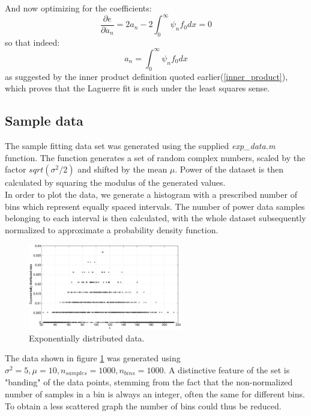 \documentclass[a4paper]{article}
\numberwithin{equation}{section}
\begin{document}
\noindent And now optimizing for the coefficients:
\begin{equation}
\frac{\partial e}{\partial a_n} = 2a_n - 2 \int_{0}^{\infty} \psi_nf_0dx = 0
\end{equation}
so that indeed:
\begin{equation}
a_n = \int_{0}^{\infty} \psi_nf_0dx
\end{equation}
as suggested by the inner product definition quoted earlier(\ref{inner_product}), which proves that the Laguerre fit is such under the least squares sense.

\subsection{Sample data}
The sample fitting data set was generated using the supplied \textit{exp\_data.m} function.
The function generates a set of random complex numbers, scaled by the factor $sqrt(\sigma^2/2)$ and shifted by the mean $\mu$. Power of the dataset is then calculated by squaring the modulus of the generated values. \\
In order to plot the data, we generate a histogram with a prescribed number of bins which represent equally spaced intervals. The number of power data samples belonging to each interval is then calculated, with the whole dataset subsequently normalized to approximate a probability density function.

\begin{figure}
\centering
\includegraphics[width=0.6\textwidth]{exp_data.eps}
\caption{\label{fig:expdata}Exponentially distributed data.}
\end{figure}

\noindent The data shown in figure \ref{fig:expdata} was generated using $\sigma^2=5, \mu=10, n_{samples} = 1000, n_{bins} = 1000$. A distinctive feature of the set is "banding" of the data points, stemming from the fact that the non-normalized number of samples in a bin is always an integer, often the same for different bins. To obtain a less scattered graph the number of bins could thus be reduced.
\end{document}
